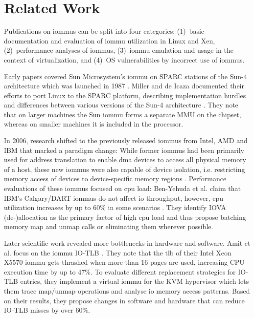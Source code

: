 \chapter{Related Work}
\label{chap:related_work}

Publications on \acp{iommu} can be split into four categories:
(1)~basic documentation and evaluation of \ac{iommu} utilization in Linux and
   Xen,
(2)~performance analyses of \acp{iommu},
(3)~\ac{iommu} emulation and usage in the context of virtualization, and
(4)~OS vulnerabilities by incorrect use of \acp{iommu}.

Early papers covered Sun Microsystem's \ac{iommu} on SPARC stations of the Sun-4
architecture which was launched in 1987 \cite{miller1996linux,
kunisawa1997gigabit}.  Miller and de Icaza documented their efforts to port
Linux to the SPARC platform, describing implementation hurdles and differences
between various versions of the Sun-4 architecture \cite{miller1996linux}. They
note that on larger machines the Sun \ac{iommu} forms a separate MMU on the
chipset, whereas on smaller machines it is included in the processor.

In 2006, research shifted to the previously released \acp{iommu} from Intel, AMD
and IBM that marked a paradigm change: While former \acp{iommu} had been
primarily used for address translation to enable \ac{dma} devices to access all
physical memory of a host, these new \acp{iommu} were also capable of device
isolation, i.e. restricting memory access of devices to device-specific memory
regions \cite{ben2006utilizing}. Performance evaluations of these \acp{iommu}
focused on \ac{cpu} load: Ben-Yehuda et al. claim that IBM's Calgary/DART
\acp{iommu} do not affect \ac{io} throughput, however, \ac{cpu} utilization
increases by up to 60\% in some scenarios \cite{ben2007price}. They identify
IOVA (de-)allocation as the primary factor of high \ac{cpu} load and thus
propose batching memory map and unmap calls or eliminating them wherever
possible.

Later scientific work revealed more bottlenecks in hardware and software. Amit
et al. focus on the \ac{iommu} IO-TLB \cite{amit2010iommu}. They note that the
\ac{tlb} of their Intel Xeon X5570 \ac{iommu} gets thrashed when more than 16
pages are used, increasing CPU execution time by up to 47\%. To evaluate
different replacement strategies for IO-TLB entries, they implement a virtual
\ac{iommu} for the KVM hypervisor which lets them trace map/unmap operations and
analyse \ac{io} memory access patterns. Based on their results, they propose
changes in software and hardware that can reduce IO-TLB misses by over 60\%.


